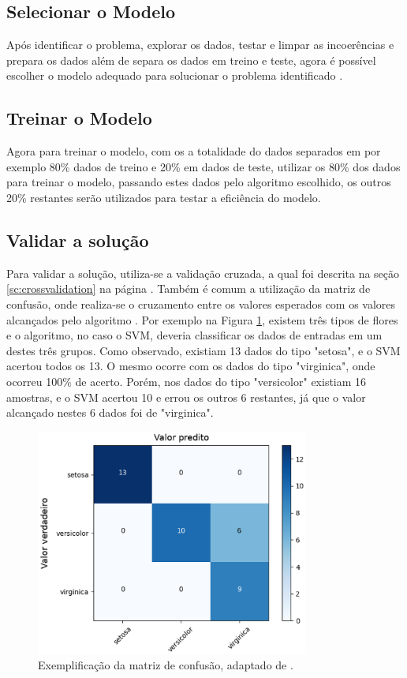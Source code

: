 \subsection{Selecionar o Modelo}
Após identificar o problema, explorar os dados, testar e limpar as incoerências e prepara os dados além de separa os dados em treino e teste, agora é possível escolher o modelo adequado para solucionar o problema identificado \cite{geron2017hands}.

\subsection{Treinar o Modelo}
Agora para treinar o modelo, com os a totalidade do dados separados em por exemplo 80\% dados de treino e 20\% em dados de teste, utilizar os 80\% dos dados para treinar o modelo, passando estes dados pelo algoritmo escolhido, os outros 20\% restantes serão utilizados para testar a eficiência do modelo.

\subsection{Validar a solução}
Para validar a solução, utiliza-se a validação cruzada, a qual foi descrita na seção \ref{sc:crossvalidation} na página \pageref{sc:crossvalidation}. Também é comum a utilização da matriz de confusão, onde realiza-se o cruzamento entre os valores esperados com os valores alcançados pelo algoritmo \cite{caelen2017bayesian}. Por exemplo na Figura \ref{matriz_consusao}, existem três tipos de flores e o algoritmo, no caso o SVM, deveria classificar os dados de entradas em um destes três grupos. Como observado, existiam 13 dados do tipo "setosa", e o SVM acertou todos os 13. O mesmo ocorre com os dados do tipo "virginica", onde ocorreu 100\% de acerto. Porém, nos dados do tipo "versicolor" existiam 16 amostras, e o SVM acertou 10 e errou os outros 6 restantes, já que o valor alcançado nestes 6 dados foi de "virginica".

\begin{figure}[!htb]
	\centering
	\includegraphics[width=0.8\textwidth]{figuras/matriz_consusao.eps}
	\caption{Exemplificação da matriz de confusão, adaptado de .}
	\label{matriz_consusao}
\end{figure}

